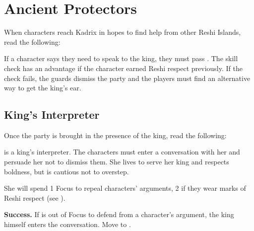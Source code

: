 \section{Ancient Protectors}

When characters reach Kadrix in hopes to find help from other Reshi Islands, read the following:


If a character says they need to speak to the king, they must pass . The skill check has an advantage if the character earned Reshi respect previously. If the check fails, the guards dismiss the party and the players must find an alternative way to get the king's ear.

\subsection{King's Interpreter}

Once the party is brought in the presence of the king, read the following:


\npcReshiInterpreter[s] is a king's interpreter. The characters must enter a conversation with her and persuade her not to dismiss them.
She lives to serve her king and respects boldness, but is cautious not to overstep.

She will spend 1 Focus to repeal characters' arguments, 2 if they wear marks of Reshi respect (see ).

\textbf{Success.} If \npcReshiInterpreter{} is out of Focus to defend from a character's argument, the king himself enters the conversation. Move to .

